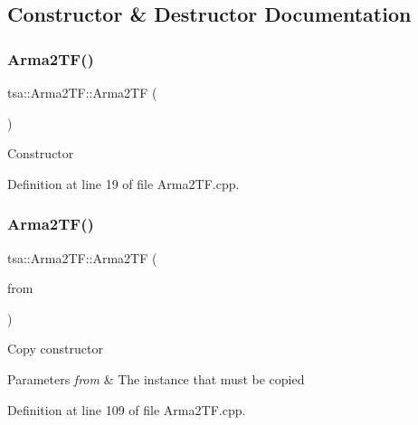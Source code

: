 \subsection{Constructor \& Destructor Documentation}
\mbox{\label{classtsa_1_1_arma2_t_f_aabbe1c03f711805d11bf7f4951149617}} 
\subsubsection{\texorpdfstring{Arma2\+T\+F()}{Arma2TF()}\hspace{0.1cm}{\footnotesize\ttfamily [1/2]}}
{\footnotesize\ttfamily tsa\+::\+Arma2\+T\+F\+::\+Arma2\+TF (\begin{DoxyParamCaption}{ }\end{DoxyParamCaption})}

Constructor 

Definition at line 19 of file Arma2\+T\+F.\+cpp.

\mbox{\label{classtsa_1_1_arma2_t_f_a93ac79691dd4f811d21f2021476ce4b5}} 
\subsubsection{\texorpdfstring{Arma2\+T\+F()}{Arma2TF()}\hspace{0.1cm}{\footnotesize\ttfamily [2/2]}}
{\footnotesize\ttfamily tsa\+::\+Arma2\+T\+F\+::\+Arma2\+TF (\begin{DoxyParamCaption}\item[{const \hyperlink{classtsa_1_1_arma2_t_f}{Arma2\+TF} \&}]{from }\end{DoxyParamCaption})}

Copy constructor


\begin{DoxyParams}{Parameters}
{\em from} & The instance that must be copied \\
\hline
\end{DoxyParams}


Definition at line 109 of file Arma2\+T\+F.\+cpp.

\mbox{\label{classtsa_1_1_arma2_t_f_aa48720a5c5a48ebfbaf1ee080f27a411}} 
